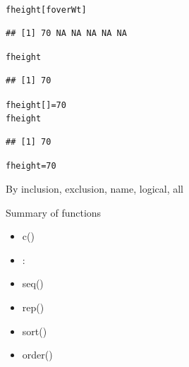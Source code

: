 \documentclass{beamer}\usepackage[]{graphicx}\usepackage[]{color}
\makeatletter
\newcommand{\hlnum}[1]{\textcolor[rgb]{0.686,0.059,0.569}{#1}}%
\newcommand{\hlstd}[1]{\textcolor[rgb]{0.345,0.345,0.345}{#1}}%
\newcommand{\hlkwb}[1]{\textcolor[rgb]{0.69,0.353,0.396}{#1}}%
\newenvironment{kframe}{%
 \def\at@end@of@kframe{}%
 \ifinner\ifhmode%
  \def\at@end@of@kframe{\end{minipage}}%
  \begin{minipage}{\columnwidth}%
 \fi\fi%
 \def\FrameCommand##1{\hskip\@totalleftmargin \hskip-\fboxsep
 \colorbox{shadecolor}{##1}\hskip-\fboxsep
     \hskip-\linewidth \hskip-\@totalleftmargin \hskip\columnwidth}%
 \MakeFramed {\advance\hsize-\width
   \@totalleftmargin\z@ \linewidth\hsize
   \@setminipage}}%
 {\par\unskip\endMakeFramed%
 \at@end@of@kframe}
\newenvironment{knitrout}{}{} %
\renewenvironment{knitrout}{\begin{singlespace}}{\end{singlespace}}
\theoremstyle{mystyle}
\makeatother
\begin{document}
\begin{frame}[fragile]{}
\begin{knitrout}
\color{fgcolor}\begin{kframe}
\begin{alltt}
\hlstd{fheight[foverWt]}
\end{alltt}
\begin{verbatim}
## [1] 70 NA NA NA NA NA
\end{verbatim}
\begin{alltt}
\hlstd{fheight}
\end{alltt}
\begin{verbatim}
## [1] 70
\end{verbatim}
\begin{alltt}
\hlstd{fheight[]} \hlkwb{=} \hlnum{70}
\hlstd{fheight}
\end{alltt}
\begin{verbatim}
## [1] 70
\end{verbatim}
\begin{alltt}
\hlstd{fheight} \hlkwb{=} \hlnum{70}
\end{alltt}
\end{kframe}
\end{knitrout}
By inclusion, exclusion, name, logical, all
\end{frame}

\begin{frame}[fragile]{Summary of functions}
\begin{itemize}
\item c()
\item :
\item seq()
\item rep()
\item sort()
\item order()
\end{itemize}
\end{frame}
\end{document}
